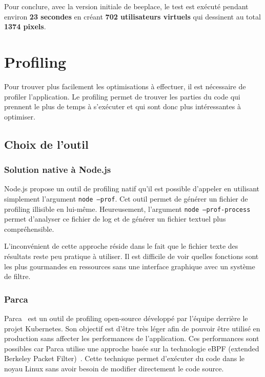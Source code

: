 Pour conclure, avec la version initiale de \gls{beeplace}, le test est exécuté pendant environ \textbf{23 secondes} en créant \textbf{702 utilisateurs virtuels} qui dessinent au total \textbf{1374 pixels}.

\section{Profiling}

Pour trouver plus facilement les optimisations à effectuer, il est nécessaire de profiler l'application. Le profiling permet de trouver les parties du code qui prennent le plus de temps à s'exécuter et qui sont donc plus intéressantes à optimiser.

\subsection{Choix de l'outil}

\subsubsection{Solution native à Node.js}

Node.js propose un outil de profiling natif qu'il est possible d'appeler en utilisant simplement l'argument \texttt{node --prof}. Cet outil permet de générer un fichier de profiling illisible en lui-même. Heureusement, l'argument \texttt{node --prof-process} permet d'analyser ce fichier de log et de générer un fichier textuel plus compréhensible.

L'inconvénient de cette approche réside dans le fait que le fichier texte des résultats reste peu pratique à utiliser. Il est difficile de voir quelles fonctions sont les plus gourmandes en ressources sans une interface graphique avec un système de filtre.

\subsubsection{Parca}

Parca~\cite{parca} est un outil de profiling open-source développé par l'équipe derrière le projet Kubernetes. Son objectif est d'être très léger afin de pouvoir être utilisé en production sans affecter les performances de l'application. Ces performances sont possibles car Parca utilise une approche basée sur la technologie eBPF (extended Berkeley Packet Filter)~\cite{ebpf}. Cette technique permet d'exécuter du code dans le noyau Linux sans avoir besoin de modifier directement le code source.

